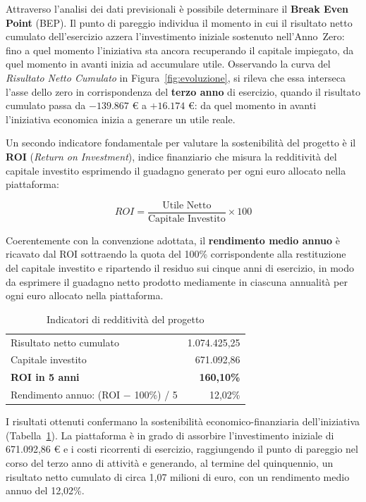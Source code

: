 Attraverso l'analisi dei dati previsionali \`e possibile determinare il \textbf{Break Even Point} (BEP). Il punto di pareggio individua il momento in cui il risultato netto cumulato dell'esercizio azzera l'investimento iniziale sostenuto nell'Anno~Zero: fino a quel momento l'iniziativa sta ancora recuperando il capitale impiegato, da quel momento in avanti inizia ad accumulare utile. Osservando la curva del \textit{Risultato Netto Cumulato} in Figura~\ref{fig:evoluzione}, si rileva che essa interseca l'asse dello zero in corrispondenza del \textbf{terzo anno} di esercizio, quando il risultato cumulato passa da $-139.867$ \euro{} a $+16.174$ \euro{}: da quel momento in avanti l'iniziativa economica inizia a generare un utile reale.

Un secondo indicatore fondamentale per valutare la sostenibilit\`a del progetto \`e il \textbf{ROI} (\textit{Return on Investment}), indice finanziario che misura la redditivit\`a del capitale investito esprimendo il guadagno generato per ogni euro allocato nella piattaforma:

\begin{equation}
    ROI = \frac{\text{Utile Netto}}{\text{Capitale Investito}} \times 100
\end{equation}

Coerentemente con la convenzione adottata, il \textbf{rendimento medio annuo} \`e ricavato dal
ROI sottraendo la quota del 100\% corrispondente alla restituzione del capitale investito e
ripartendo il residuo sui cinque anni di esercizio, in modo da esprimere il guadagno netto
prodotto mediamente in ciascuna annualit\`a per ogni euro allocato nella piattaforma.

\begin{table}[H]
\centering
\begin{tabular}{lr}
\hline
Risultato netto cumulato & 1.074.425,25 \\
Capitale investito       &   671.092,86 \\
\hline
\textbf{ROI in 5 anni}   & \textbf{160,10\%} \\
Rendimento annuo: (ROI $-$ 100\%) / 5 & 12,02\% \\
\hline
\end{tabular}
\caption{Indicatori di redditivit\`a del progetto}
\label{tab:roi}
\end{table}

I risultati ottenuti confermano la sostenibilit\`a economico-finanziaria dell'iniziativa (Tabella~\ref{tab:roi}). La piattaforma \`e in grado di assorbire l'investimento iniziale di 671.092,86 \euro{} e i costi ricorrenti di esercizio, raggiungendo il punto di pareggio nel corso del terzo anno di attivit\`a e generando, al termine del quinquennio, un risultato netto cumulato di circa 1,07 milioni di euro, con un rendimento medio annuo del 12,02\%.

